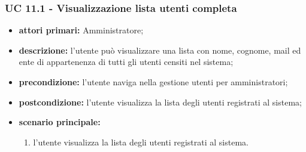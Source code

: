 			\subsubsection{UC 11.1 - Visualizzazione lista utenti completa}
			\begin{itemize}
				\item \textbf{attori primari:} Amministratore;
				\item \textbf{descrizione:} l'utente può visualizzare una lista con nome, cognome, mail ed ente di appartenenza di tutti gli utenti censiti nel sistema;
				\item \textbf{precondizione:} l'utente naviga nella gestione utenti per amministratori;
				\item \textbf{postcondizione:} l'utente visualizza la lista degli utenti registrati al sistema;
				\item \textbf{scenario principale:}
				\begin{enumerate}
					\item{l'utente visualizza la lista degli utenti registrati al sistema.}
				\end{enumerate}	
			\end{itemize}
			
